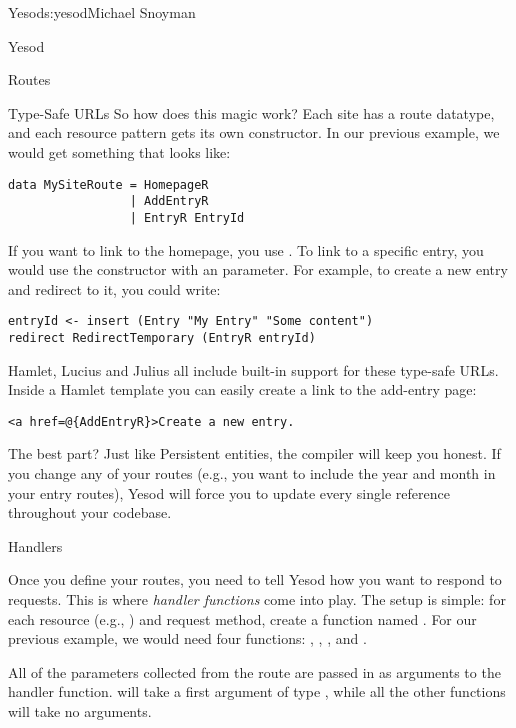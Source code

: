 \begin{aosachapter}{Yesod}{s:yesod}{Michael Snoyman}
\begin{aosasect1}{Yesod}
\begin{aosasect2}{Routes}
\begin{aosasect3}{Type-Safe URLs}
So how does this magic work? Each site has a route datatype, and each
resource pattern gets its own constructor. In our previous example, we
would get something that looks like:

\begin{verbatim}
data MySiteRoute = HomepageR
                 | AddEntryR
                 | EntryR EntryId

\end{verbatim}

If you want to link to the homepage, you use . To link
to a specific entry, you would use the  constructor with
an  parameter. For example, to create a new entry and
redirect to it, you could write:

\begin{verbatim}
entryId <- insert (Entry "My Entry" "Some content")
redirect RedirectTemporary (EntryR entryId)
\end{verbatim}

Hamlet, Lucius and Julius all include built-in support for these
type-safe URLs. Inside a Hamlet template you can easily create a link
to the add-entry page:

\begin{verbatim}
<a href=@{AddEntryR}>Create a new entry.
\end{verbatim}

The best part? Just like Persistent entities, the compiler will keep
you honest. If you change any of your routes (e.g., you want to
include the year and month in your entry routes), Yesod will force you
to update every single reference throughout your codebase.

\end{aosasect3}

\end{aosasect2}

\begin{aosasect2}{Handlers}

Once you define your routes, you need to tell Yesod how you want to
respond to requests. This is where \emph{handler functions} come into
play. The setup is simple: for each resource (e.g., )
and request method, create a function named . For our
previous example, we would need four functions: ,
, , and .

All of the parameters collected from the route are passed in as
arguments to the handler function.  will take a first
argument of type , while all the other functions will take no
arguments.


\end{aosasect2}
\end{aosasect1}
\end{aosachapter}
